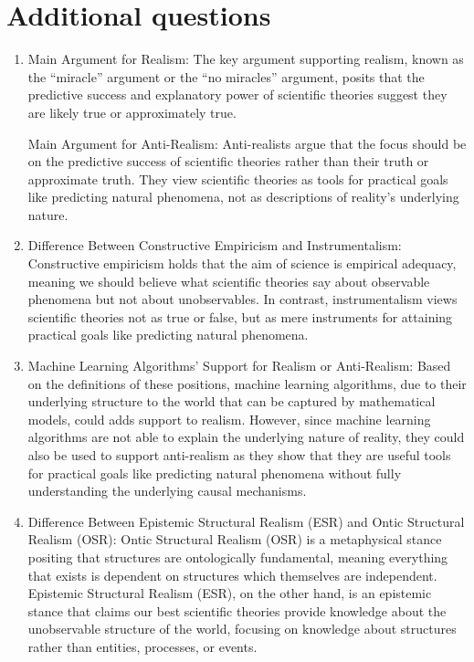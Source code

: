 \documentclass[UTF8,a4paper,AutoFakeBold,AutoFakeSlant]{article}
\begin{document}
\section{Additional questions}

\begin{enumerate}
    \item Main Argument for Realism: The key argument supporting realism, known as the “miracle” argument or the “no miracles” argument, posits that the predictive success and explanatory power of scientific theories suggest they are likely true or approximately true.

    Main Argument for Anti-Realism: Anti-realists argue that the focus should be on the predictive success of scientific theories rather than their truth or approximate truth. They view scientific theories as tools for practical goals like predicting natural phenomena, not as descriptions of reality's underlying nature.
    \item Difference Between Constructive Empiricism and Instrumentalism: Constructive empiricism holds that the aim of science is empirical adequacy, meaning we should believe what scientific theories say about observable phenomena but not about unobservables. In contrast, instrumentalism views scientific theories not as true or false, but as mere instruments for attaining practical goals like predicting natural phenomena.
    \item Machine Learning Algorithms' Support for Realism or Anti-Realism: Based on the definitions of these positions, machine learning algorithms, due to their underlying structure to the world that can be captured by mathematical models, could adds support to realism. However, since machine learning algorithms are not able to explain the underlying nature of reality, they could also be used to support anti-realism as they show that they are useful tools for practical goals like predicting natural phenomena without fully understanding the underlying causal mechanisms.
    \item Difference Between Epistemic Structural Realism (ESR) and Ontic Structural Realism (OSR): Ontic Structural Realism (OSR) is a metaphysical stance positing that structures are ontologically fundamental, meaning everything that exists is dependent on structures which themselves are independent. Epistemic Structural Realism (ESR), on the other hand, is an epistemic stance that claims our best scientific theories provide knowledge about the unobservable structure of the world, focusing on knowledge about structures rather than entities, processes, or events.
\end{enumerate}




% 
% 
% 
\end{document}
